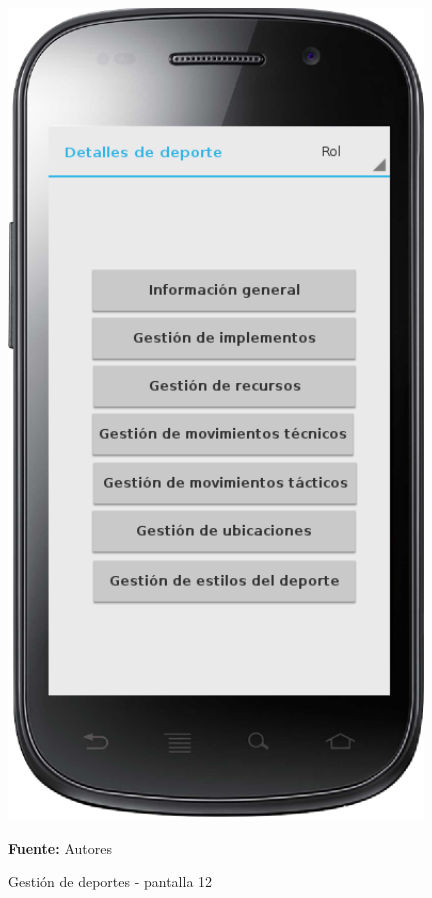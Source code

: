 \begin{figure}[!htb]
  \begin{center}
    \includegraphics[width=11cm]{./imagenes/UI/Deportes/gestion_deportes_12.png}
    \caption{Gestión de deportes - pantalla 12}
    \label{fig:gestion_deportes_12}
    \textbf{Fuente:}  Autores
  \end{center}
\end{figure}

